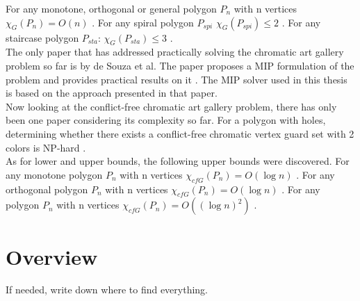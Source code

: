 For any monotone, orthogonal or general polygon $P_n$ with n vertices $\chi_G(P_n) = O(n)$ \cite{bartschi2011coloring}.
For any spiral polygon $P_{spi}$ $\chi_G(P_{spi}) \leq 2$ \cite{erickson2012art}.
For any staircase polygon $P_{sta}$: $\chi_G(P_{sta}) \leq 3$ \cite{erickson2012art}.\\
The only paper that has addressed practically solving the chromatic art gallery problem so far is by de Souza et al. The paper proposes a MIP formulation of the problem and provides practical results on it \cite{zambon2014exact}. The MIP solver used in this thesis is based on the approach presented in that paper.\\
Now looking at the conflict-free chromatic art gallery problem, there has only been one paper considering its complexity so far.
For a polygon with holes, determining whether there exists a conflict-free chromatic vertex guard set with 2 colors is NP-hard \cite{iwamoto2022vertex}.\\
As for lower and upper bounds, the following upper bounds were discovered.
For any monotone polygon $P_n$ with n vertices $\chi_{cfG}(P_n) = O(\log n)$ \cite{bartschi2011coloring}.
For any orthogonal polygon $P_n$ with n vertices $\chi_{cfG}(P_n) = O(\log n)$ \cite{bartschi2011coloring}.
For any polygon $P_n$ with n vertices $\chi_{cfG}(P_n) = O((\log n)^2)$ \cite{bartschi2011coloring}.


\section{Overview}
If needed, write down where to find everything.
